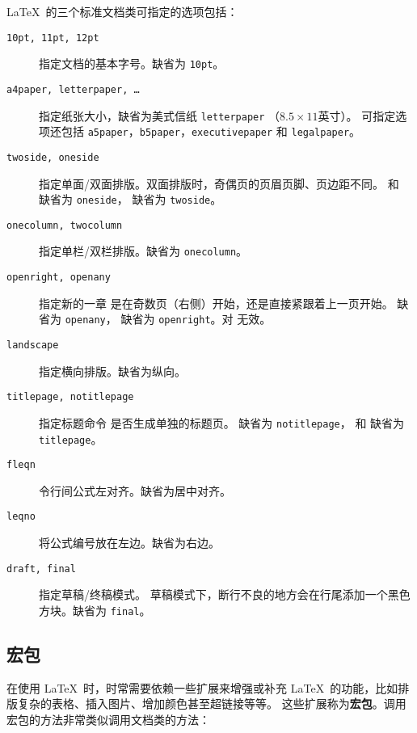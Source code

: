 \LaTeX\ 的三个标准文档类可指定的选项包括：
\begin{description}
\item[\texttt{10pt, 11pt, 12pt}] \quad 指定文档的基本字号。缺省为 \texttt{10pt}。

\item[\texttt{a4paper, letterpaper, \ldots}] \quad 指定纸张大小，缺省为美式信纸 \texttt{letterpaper} （$8.5\times11$英寸）。
可指定选项还包括 \texttt{a5paper}，\texttt{b5paper}，\texttt{executivepaper} 和 \texttt{legalpaper}。

\item[\texttt{twoside, oneside}] \quad 指定单面/双面排版。双面排版时，奇偶页的页眉页脚、页边距不同。
 和  缺省为 \texttt{oneside}， 缺省为 \texttt{twoside}。

\item[\texttt{onecolumn, twocolumn}] \quad 指定单栏/双栏排版。缺省为 \texttt{onecolumn}。

\item[\texttt{openright, openany}] \quad 指定新的一章  是在奇数页（右侧）开始，还是直接紧跟着上一页开始。
 缺省为 \texttt{openany}， 缺省为 \texttt{openright}。对  无效。

\item[\texttt{landscape}] \quad 指定横向排版。缺省为纵向。

\item[\texttt{titlepage, notitlepage}] 指定标题命令  是否生成单独的标题页。
 缺省为 \texttt{notitlepage}， 和  缺省为 \texttt{titlepage}。

\item[\texttt{fleqn}] \quad 令行间公式左对齐。缺省为居中对齐。

\item[\texttt{leqno}] \quad 将公式编号放在左边。缺省为右边。

\item[\texttt{draft, final}] \quad 指定草稿/终稿模式。
草稿模式下，断行不良的地方会在行尾添加一个黑色方块。缺省为 \texttt{final}。
\end{description}

\subsection{宏包}\label{subsec:packages}

在使用 \LaTeX\ 时，时常需要依赖一些扩展来增强或补充 \LaTeX\ 的功能，比如排版复杂的表格、插入图片、增加颜色甚至超链接等等。
这些扩展称为\textbf{宏包}。调用宏包的方法非常类似调用文档类的方法：
\begin{command}
\end{command}

